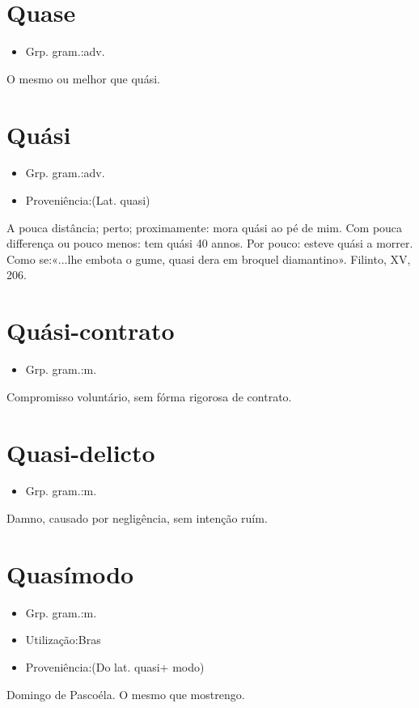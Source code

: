 \section{Quase}
\begin{itemize}
\item {Grp. gram.:adv.}
\end{itemize}
O mesmo ou melhor que \textunderscore quási\textunderscore .
\section{Quási}
\begin{itemize}
\item {Grp. gram.:adv.}
\end{itemize}
\begin{itemize}
\item {Proveniência:(Lat. \textunderscore quasi\textunderscore )}
\end{itemize}
A pouca distância; perto; proximamente: \textunderscore mora quási ao pé de mim\textunderscore .
Com pouca differença ou pouco menos: \textunderscore tem quási 40 annos\textunderscore .
Por pouco: \textunderscore esteve quási a morrer\textunderscore .
Como se:«\textunderscore ...lhe embota o gume, quasi dera em broquel diamantino\textunderscore ». Filinto, XV, 206.
\section{Quási-contrato}
\begin{itemize}
\item {Grp. gram.:m.}
\end{itemize}
Compromisso voluntário, sem fórma rigorosa de contrato.
\section{Quasi-delicto}
\begin{itemize}
\item {Grp. gram.:m.}
\end{itemize}
Damno, causado por negligência, sem intenção ruím.
\section{Quasímodo}
\begin{itemize}
\item {Grp. gram.:m.}
\end{itemize}
\begin{itemize}
\item {Utilização:Bras}
\end{itemize}
\begin{itemize}
\item {Proveniência:(Do lat. \textunderscore quasi\textunderscore  + \textunderscore modo\textunderscore )}
\end{itemize}
Domingo de Pascoéla.
O mesmo que \textunderscore mostrengo\textunderscore .

